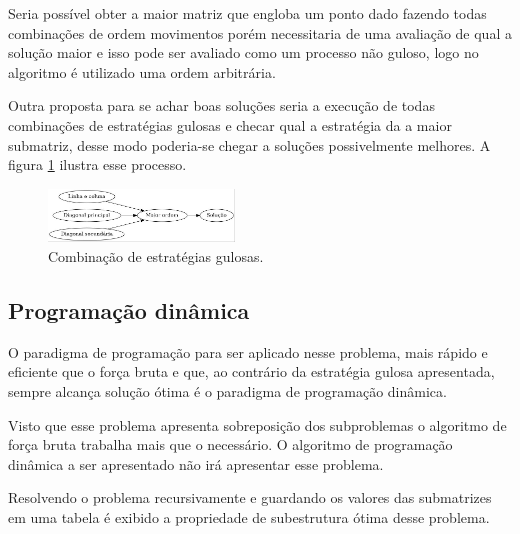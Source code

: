 \documentclass[10.9pt]{article}
\begin{document}
Seria possível obter a maior matriz que engloba um ponto dado fazendo todas combinações de ordem movimentos porém necessitaria de uma avaliação de qual a solução maior e isso pode ser avaliado como um processo não guloso, logo no algoritmo é utilizado uma ordem arbitrária.

Outra proposta para se achar boas soluções seria a execução de todas combinações de estratégias gulosas e checar qual a estratégia da a maior submatriz, desse modo poderia-se chegar a soluções possivelmente melhores. A figura \ref{fig:combgulosa} ilustra esse processo.

\begin{figure}[htbp]
\centering
\includegraphics[width=0.44\textwidth]{combgulosa.jpg}
\caption{Combinação de estratégias gulosas.\label{fig:combgulosa}}
\end{figure}

\subsection{Programação dinâmica}
\label{sec:orgafe0f9a}
O paradigma de programação para ser aplicado nesse problema, mais rápido e eficiente que o força bruta e que, ao contrário da estratégia gulosa apresentada, sempre alcança solução ótima é o paradigma de programação dinâmica.

Visto que esse problema apresenta sobreposição dos subproblemas o algoritmo de força bruta trabalha mais que o necessário. O algoritmo de programação dinâmica a ser apresentado não irá apresentar esse problema.

Resolvendo o problema recursivamente \cite{laaksonen17_introd} e guardando os valores das submatrizes em uma tabela é exibido a propriedade de subestrutura ótima \cite{cormen09_introd} desse problema.
\end{document}
